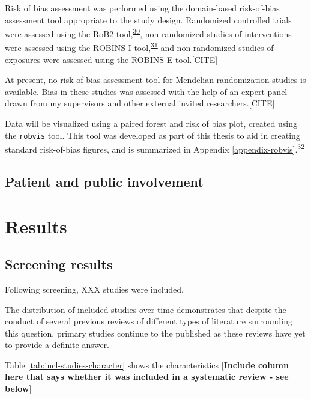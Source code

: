 \documentclass[a4paper, twoside]{templates/ociamthesis}
\begin{document}
Risk of bias assessment was performed using the domain-based risk-of-bias assessment tool appropriate to the study design. Randomized controlled trials were assessed using the RoB2 tool,\textsuperscript{\protect\hyperlink{ref-sterne2019}{30}}, non-randomized studies of interventions were assessed using the ROBINS-I tool,\textsuperscript{\protect\hyperlink{ref-sterne2016}{31}} and non-randomized studies of exposures were assessed using the ROBINS-E tool.{[}CITE{]}

At present, no risk of bias assessment tool for Mendelian randomization studies is available. Bias in these studies was assessed with the help of an expert panel drawn from my supervisors and other external invited researchers.{[}CITE{]}

Data will be visualized using a paired forest and risk of bias plot, created using the \texttt{robvis} tool. This tool was developed as part of this thesis to aid in creating standard risk-of-bias figures, and is summarized in Appendix \ref{appendix-robvis}.\textsuperscript{\protect\hyperlink{ref-mcguinness2019}{32}}

\hypertarget{patient-and-public-involvement}{%
\subsection{Patient and public involvement}\label{patient-and-public-involvement}}

\hypertarget{results}{%
\section{Results}\label{results}}

\hypertarget{screening-results}{%
\subsection{Screening results}\label{screening-results}}

Following screening, XXX studies were included.

The distribution of included studies over time demonstrates that despite the conduct of several previous reviews of different types of literature surrounding this question, primary studies continue to the published as these reviews have yet to provide a definite answer.

Table \ref{tab:incl-studies-character} shows the characteristics {[}\textbf{Include column here that says whether it was included in a systematic review - see below}{]}
\end{document}
